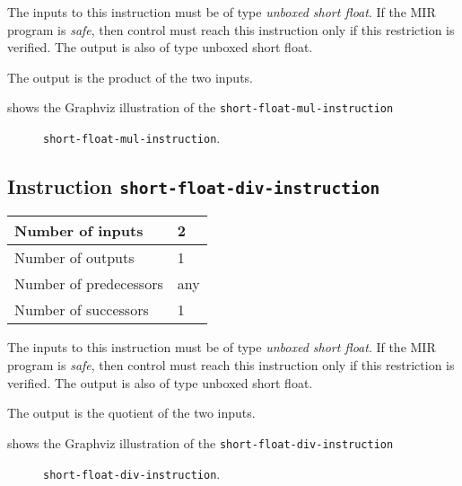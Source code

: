 The inputs to this instruction must be of type \emph{unboxed short
  float}.  If the MIR program is \emph{safe}, then control must reach
this instruction only if this restriction is verified.  The output is
also of type unboxed short float.

The output is the product of the two inputs.

 shows the Graphviz illustration of the
\texttt{short-float-mul-instruction}

\begin{figure}
\begin{center}
\end{center}
\caption{\label{fig-short-float-mul-instruction}
\texttt{short-float-mul-instruction}.}
\end{figure}

\subsection{Instruction \texttt{short-float-div-instruction}}
\label{mir-instruction-short-float-div}

\begin{tabular}{|l|l|}
\hline
Number of inputs & 2\\
\hline
Number of outputs & 1\\
\hline
Number of predecessors & any\\
\hline
Number of successors & 1\\
\hline
\end{tabular}

The inputs to this instruction must be of type \emph{unboxed short
  float}.  If the MIR program is \emph{safe}, then control must reach
this instruction only if this restriction is verified.  The output is
also of type unboxed short float.

The output is the quotient of the two inputs.

 shows the Graphviz illustration of the
\texttt{short-float-div-instruction}

\begin{figure}
\begin{center}
\end{center}
\caption{\label{fig-short-float-div-instruction}
\texttt{short-float-div-instruction}.}
\end{figure}

